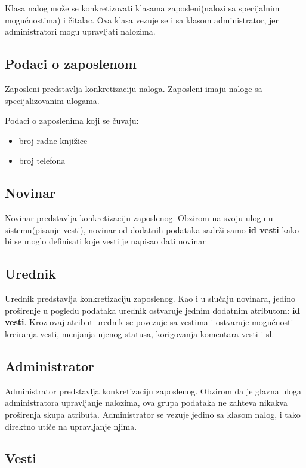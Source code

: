 \documentclass{article}
\begin{document}
Klasa nalog može se konkretizovati klasama zaposleni(nalozi sa specijalnim mogućnostima) i čitalac. Ova klasa vezuje se i sa klasom administrator, jer administratori mogu upravljati nalozima.

\subsection{Podaci o zaposlenom}
Zaposleni predstavlja konkretizaciju naloga. Zaposleni imaju naloge sa specijalizovanim ulogama.

Podaci o zaposlenima koji se čuvaju:
\begin{itemize}
    \item broj radne knjižice
    \item broj telefona
\end{itemize}

\subsection{Novinar}

Novinar predstavlja konkretizaciju zaposlenog. Obzirom na svoju ulogu u sistemu(pisanje vesti), novinar od dodatnih podataka sadrži samo \textbf{id vesti} kako bi se moglo definisati koje vesti je napisao dati novinar

\subsection{Urednik}

Urednik predstavlja konkretizaciju zaposlenog. Kao i u slučaju novinara, jedino proširenje u pogledu podataka urednik ostvaruje jednim dodatnim atributom: \textbf{id vesti}. Kroz ovaj atribut urednik se povezuje sa vestima i ostvaruje mogućnosti kreiranja vesti, menjanja njenog statusa, korigovanja komentara vesti i sl.

\subsection{Administrator}

Administrator predstavlja konkretizaciju zaposlenog. Obzirom da je glavna uloga administratora upravljanje nalozima, ova grupa podataka ne zahteva nikakva proširenja skupa atributa. Administrator se vezuje jedino sa klasom nalog, i tako direktno utiče na upravljanje njima. 

\subsection{Vesti}
\end{document}
